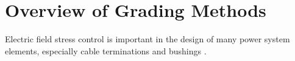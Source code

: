 \section{Overview of Grading Methods}
Electric field stress control is important in the design of many power system elements, especially cable terminations and bushings \cite{james2008condition}.


